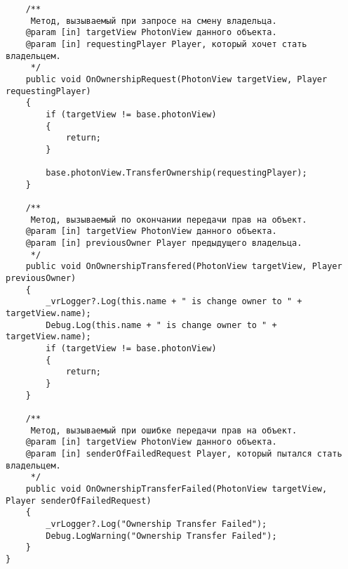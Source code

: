 \begin{verbatim}
    /**
     Метод, вызываемый при запросе на смену владельца.
    @param [in] targetView PhotonView данного объекта.
    @param [in] requestingPlayer Player, который хочет стать владельцем.
     */
    public void OnOwnershipRequest(PhotonView targetView, Player requestingPlayer)
    {
        if (targetView != base.photonView)
        {
            return;
        }

        base.photonView.TransferOwnership(requestingPlayer);
    }

    /**
     Метод, вызываемый по окончании передачи прав на объект.
    @param [in] targetView PhotonView данного объекта.
    @param [in] previousOwner Player предыдущего владельца.
     */
    public void OnOwnershipTransfered(PhotonView targetView, Player previousOwner)
    {
        _vrLogger?.Log(this.name + " is change owner to " + targetView.name);
        Debug.Log(this.name + " is change owner to " + targetView.name);
        if (targetView != base.photonView)
        {
            return;
        }
    }

    /**
     Метод, вызываемый при ошибке передачи прав на объект.
    @param [in] targetView PhotonView данного объекта.
    @param [in] senderOfFailedRequest Player, который пытался стать владельцем.
     */
    public void OnOwnershipTransferFailed(PhotonView targetView, Player senderOfFailedRequest)
    {
        _vrLogger?.Log("Ownership Transfer Failed");
        Debug.LogWarning("Ownership Transfer Failed");
    }
}

\end{verbatim}
